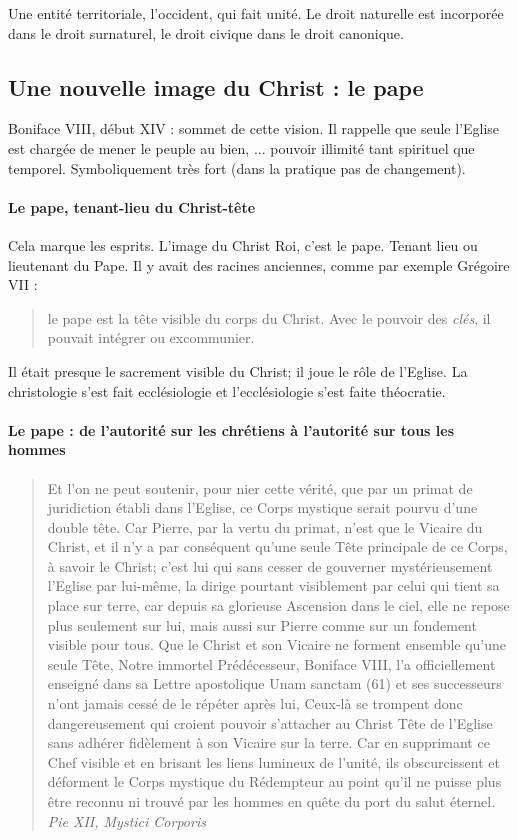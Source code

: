 Une entité territoriale, l'occident, qui fait unité. Le droit naturelle est incorporée dans le droit surnaturel, le droit civique dans le droit canonique.


\subsection{Une nouvelle image du Christ : le pape}

Boniface VIII, début XIV : sommet de cette vision. Il rappelle que seule l'Eglise est chargée de mener le peuple au bien, ... pouvoir illimité tant spirituel que temporel. Symboliquement très fort (dans la pratique pas de changement).

\paragraph{Le pape, tenant-lieu du Christ-tête} Cela marque les esprits. L'image du Christ Roi, c'est le pape. Tenant lieu ou lieutenant du Pape. Il y avait des racines anciennes, comme par exemple Grégoire VII : 
\begin{quote}
    le pape est la tête visible du corps du Christ. Avec le pouvoir des \textit{clés}, il pouvait intégrer ou excommunier. 
\end{quote}

    Il était presque le sacrement visible du Christ; il joue le rôle de l'Eglise. La christologie s'est fait ecclésiologie et l'ecclésiologie s'est faite théocratie.


\paragraph{Le pape : de l’autorité sur les chrétiens à l’autorité sur tous les hommes}


\begin{quote}
Et l'on ne peut soutenir, pour nier cette vérité, que par un primat de juridiction établi dans l'Eglise, ce Corps mystique serait pourvu d'une double tête. Car Pierre, par la vertu du primat, n'est que le Vicaire du Christ, et il n'y a par conséquent qu'une seule Tête principale de ce Corps, à savoir le Christ; c'est lui qui sans cesser de gouverner mystérieusement l'Eglise par lui-même, la dirige pourtant visiblement par celui qui tient sa place sur terre, car depuis sa glorieuse Ascension dans le ciel, elle ne repose plus seulement sur lui, mais aussi sur Pierre comme sur un fondement visible pour tous. Que le Christ et son Vicaire ne forment ensemble qu'une seule Tête, Notre immortel Prédécesseur, Boniface VIII, l'a officiellement enseigné dans sa Lettre apostolique Unam sanctam (61) et ses successeurs n'ont jamais cessé de le répéter après lui, Ceux-là se trompent donc dangereusement qui croient pouvoir s'attacher au Christ Tête de l'Eglise sans adhérer fidèlement à son Vicaire sur la terre. Car en supprimant ce Chef visible et en brisant les liens lumineux de l'unité, ils obscurcissent et déforment le Corps mystique du Rédempteur au point qu'il ne puisse plus être reconnu ni trouvé par les hommes en quête du port du salut éternel. \textit{
    Pie XII, Mystici Corporis
}\end{quote}
 
